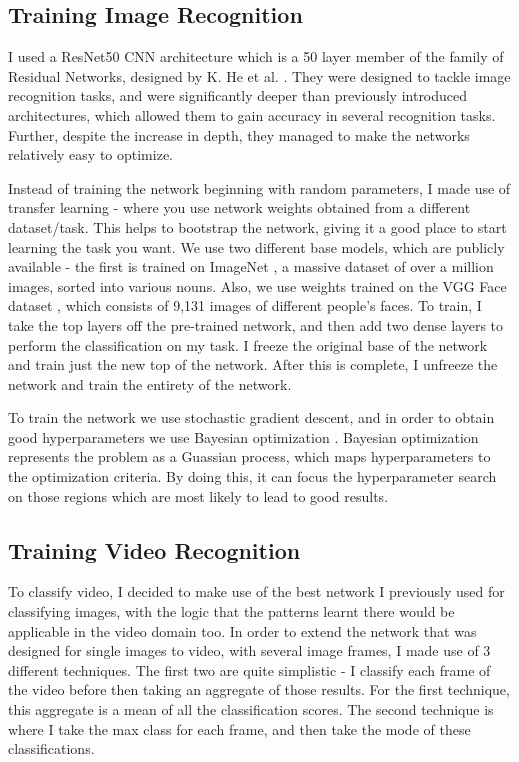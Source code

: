 \documentclass[sigconf]{acmart}
\begin{document}
{\subsection{Training Image Recognition}

I used a ResNet50 CNN architecture which is a 50 layer member of the 
family of Residual Networks, designed by K.
He et al. \cite{DBLP:journals/corr/HeZRS15}. They were designed to tackle
image recognition tasks, and were significantly deeper than previously
introduced architectures, which allowed them to gain accuracy in several
recognition tasks. 
Further, despite the increase in depth, they managed to make
the networks relatively easy to optimize.

Instead of training the network beginning with random parameters, I made use
of transfer learning - where you use network weights obtained from a different
dataset/task. This helps to bootstrap the network, giving it a good place to start
learning the task you want.  
We use two different base models, which are publicly available - the first is
trained on ImageNet \cite{ILSVRC15}, a massive dataset of over a million
images, sorted into various nouns. Also, we use weights trained on the VGG
Face dataset \cite{parkhi2015deep}, which consists of 9,131 images of
different people's faces.
To train, I take the top layers off the pre-trained network, and then add two
dense layers to perform the classification on my task. I freeze the original
base of the network and train just the new top of the network. After this is
complete, I unfreeze the network and train the entirety of the network.

To train the network we use stochastic gradient descent, and in order to
obtain good hyperparameters  we use Bayesian optimization \cite{snoek2012practical}. Bayesian
optimization represents the problem as a Guassian process, which maps
hyperparameters to the optimization criteria. By doing this, it can focus the
hyperparameter search on those regions which are most likely to lead to good
results.

\subsection{Training Video Recognition}

To classify video, I decided to make use of the best network I previously used
for classifying images, with the logic that the patterns learnt there would be
applicable in the video domain too. In order to extend the network that was
designed for single images to video, with several image frames, I made use of 3
different techniques. The first two are quite simplistic - I classify each
frame of the video before then taking an aggregate of those results. For the
first technique, this aggregate is a mean of all the classification scores.
The second technique is where I take the max class for each frame, and then
take the mode of these classifications.

}
\end{document}
